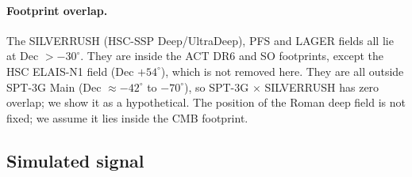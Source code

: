 \documentclass[11pt]{article}
\begin{document}
\paragraph{Footprint overlap.} The SILVERRUSH (HSC-SSP Deep/UltraDeep), PFS and LAGER fields all lie at Dec $>-30^\circ$. They are inside the ACT DR6 and SO footprints, except the HSC ELAIS-N1 field (Dec $+54^\circ$), which is not removed here. They are all outside SPT-3G Main (Dec $\approx-42^\circ$ to $-70^\circ$), so SPT-3G $\times$ SILVERRUSH has zero overlap; we show it as a hypothetical. The position of the Roman deep field is not fixed; we assume it lies inside the CMB footprint.

\subsection{Simulated signal}\label{sec:signal}
\end{document}
